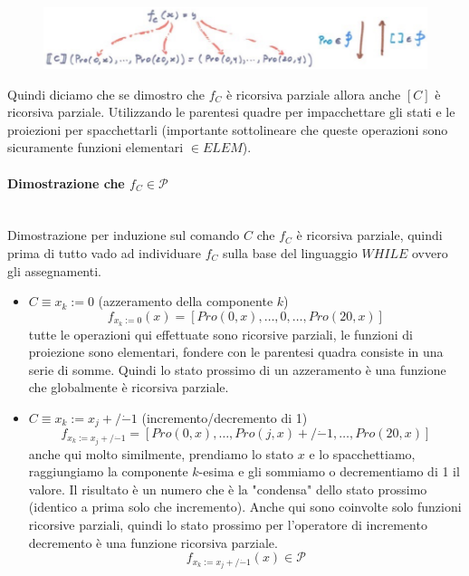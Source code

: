 \documentclass{article}
\begin{document}
\begin{figure}[H]
    \centering
    \includegraphics[scale=0.5]{images/ric-parz.png}
\end{figure}
Quindi diciamo che se dimostro che $f_C$ è ricorsiva parziale allora anche $[C]$ è ricorsiva
parziale. Utilizzando le parentesi quadre per impacchettare gli stati e le proiezioni per
spacchettarli (importante sottolineare che queste operazioni sono sicuramente
funzioni elementari $\in ELEM$).

\paragraph{Dimostrazione che $f_C\in\mathcal{P}$}\mbox{}\\
Dimostrazione per induzione sul comando $C$ che $f_C$ è ricorsiva parziale, quindi prima di
tutto vado ad individuare $f_C$ sulla base del linguaggio $WHILE$ ovvero gli assegnamenti.
\begin{itemize}
    \item $C\equiv x_k :=0$ (azzeramento della componente $k$)
          $$f_{x_k:=0}(x)=[Pro(0,x),\dots,0,\dots,Pro(20,x)]$$
          tutte le operazioni qui effettuate sono ricorsive parziali, le funzioni di proiezione
          sono elementari, fondere con le parentesi quadra consiste in una serie di somme. Quindi
          lo stato prossimo di un azzeramento è una funzione che globalmente è ricorsiva parziale.

    \item $C\equiv x_k:=x_j +/\dot{-}1$ (incremento/decremento di 1)
          $$f_{x_k:=x_j +/\dot{-}1}=[Pro(0,x),\dots,Pro(j,x)+/\dot{-}1,\dots,Pro(20,x)]$$
          anche qui molto similmente,
          prendiamo lo stato $x$ e lo spacchettiamo, raggiungiamo la componente $k$-esima e gli
          sommiamo o decrementiamo di 1 il valore. Il risultato è un numero che è la "condensa"
          dello stato prossimo (identico a prima solo che incremento). Anche qui sono coinvolte
          solo funzioni ricorsive parziali, quindi lo stato prossimo per l'operatore di incremento
          decremento è una funzione ricorsiva parziale.
          $$f_{x_k:=x_j +/\dot{-}1}(x)\in\mathcal{P}$$
\end{itemize}
\end{document}
